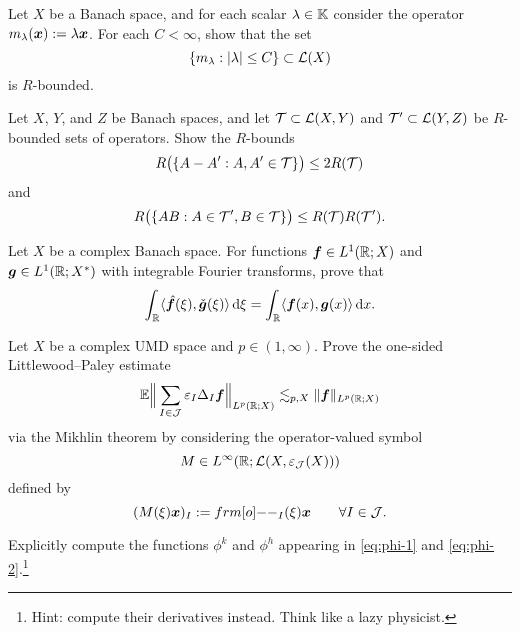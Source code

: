 \begin{exercise}\label{ex:scalars}
  Let $X$ be a Banach space, and for each scalar $\lambda \in \mathbb{K}$ consider the operator $m_{\lambda}(\bm{x}) := \lambda \bm{x}$.
  For each $C < \infty$, show that the set
  \begin{equation*}
    \{m_{\lambda} : |\lambda| \leq C\} \subset \mathcal{L}(X)
  \end{equation*}
  is $R$-bounded.
\end{exercise}

\begin{exercise}\label{ex:R-bound-stuff}
  Let $X$, $Y$, and $Z$ be Banach spaces, and let $\mathcal{T} \subset \mathcal{L}(X,Y)$ and $\mathcal{T}' \subset \mathcal{L}(Y,Z)$ be $R$-bounded sets of operators.
  Show the $R$-bounds
  \begin{equation*}
    R\big(\{A - A' : A,A' \in \mathcal{T}\} \big) \leq 2R(\mathcal{T})
  \end{equation*}
  and
  \begin{equation*}
    R\big(\{AB : A \in \mathcal{T}', B \in \mathcal{T}\}\big) \leq R(\mathcal{T})R(\mathcal{T}').
  \end{equation*}
\end{exercise}

\begin{exercise}\label{ex:fourier-inversion}
  Let $X$ be a complex Banach space.
  For functions $\bm{f} \in L^1(\mathbb{R};X)$ and $\bm{g} \in L^1(\mathbb{R};X^{*})$ with integrable Fourier transforms, prove that
  \begin{equation*}
    \int_{\mathbb{R}} \langle \hat{\bm{f}}(\xi), \check{\bm{g}}(\xi) \rangle \, \mathrm{d}\xi
    = \int_{\mathbb{R}} \langle \bm{f}(x), \bm{g}(x) \rangle \, \mathrm{d} x.
  \end{equation*}
\end{exercise}

\begin{exercise}\label{ex:LP-op-2}
  Let $X$ be a complex UMD space and $p \in (1,\infty)$.
  Prove the one-sided Littlewood--Paley estimate
  \begin{equation*}
    \mathbb{E} \Big\| \sum_{I \in \mathcal{J}} \varepsilon_{I} \Delta_{I} \bm{f} \Big\|_{L^p(\mathbb{R};X)} \lesssim_{p,X} \|\bm{f}\|_{L^p(\mathbb{R};X)}
  \end{equation*}
  via the Mikhlin theorem by considering the operator-valued symbol
  \begin{equation*}
    M \in L^\infty(\mathbb{R}; \mathcal{L}(X, \varepsilon_{\mathcal{J}}(X)))
  \end{equation*}
  defined by
  \begin{equation*}
    (M(\xi)\mb{x})_{I} := \1_{I}(\xi)\mb{x} \qquad \forall I \in \mc{J}.
  \end{equation*}
\end{exercise}

\begin{exercise}\label{ex:phi-computation}
  Explicitly compute the functions $\phi^{k}$ and $\phi^{h}$ appearing in \eqref{eq:phi-1} and \eqref{eq:phi-2}.\footnote{Hint: compute their derivatives instead. Think like a lazy physicist.}
\end{exercise}


